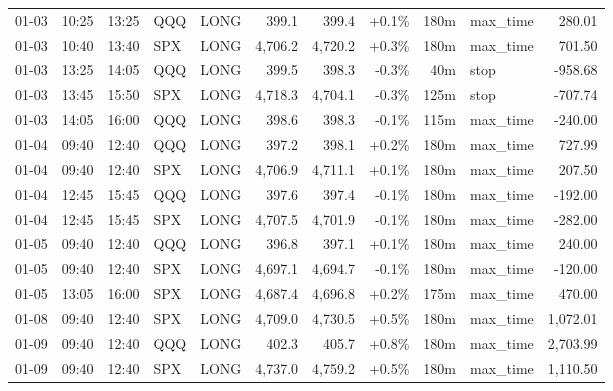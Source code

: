 \documentclass[11pt,a4paper,twoside]{article}
\begin{document}
\begin{center}
\begin{longtable}{>{\color{txtmain}}l l l l l r r r r >{\color{txtmain}}l r}
01-03 & 10:25 & 13:25 & QQQ & LONG & 399.1 & 399.4 & \textcolor{wingreen}{+0.1\%} & 180m & max\_time & \textcolor{wingreen}{280.01} \\
01-03 & 10:40 & 13:40 & SPX & LONG & 4,706.2 & 4,720.2 & \textcolor{wingreen}{+0.3\%} & 180m & max\_time & \textcolor{wingreen}{701.50} \\
01-03 & 13:25 & 14:05 & QQQ & LONG & 399.5 & 398.3 & \textcolor{lossred}{-0.3\%} & 40m & stop & \textcolor{lossred}{-958.68} \\
01-03 & 13:45 & 15:50 & SPX & LONG & 4,718.3 & 4,704.1 & \textcolor{lossred}{-0.3\%} & 125m & stop & \textcolor{lossred}{-707.74} \\
01-03 & 14:05 & 16:00 & QQQ & LONG & 398.6 & 398.3 & \textcolor{lossred}{-0.1\%} & 115m & max\_time & \textcolor{lossred}{-240.00} \\
01-04 & 09:40 & 12:40 & QQQ & LONG & 397.2 & 398.1 & \textcolor{wingreen}{+0.2\%} & 180m & max\_time & \textcolor{wingreen}{727.99} \\
01-04 & 09:40 & 12:40 & SPX & LONG & 4,706.9 & 4,711.1 & \textcolor{wingreen}{+0.1\%} & 180m & max\_time & \textcolor{wingreen}{207.50} \\
01-04 & 12:45 & 15:45 & QQQ & LONG & 397.6 & 397.4 & \textcolor{lossred}{-0.1\%} & 180m & max\_time & \textcolor{lossred}{-192.00} \\
01-04 & 12:45 & 15:45 & SPX & LONG & 4,707.5 & 4,701.9 & \textcolor{lossred}{-0.1\%} & 180m & max\_time & \textcolor{lossred}{-282.00} \\
01-05 & 09:40 & 12:40 & QQQ & LONG & 396.8 & 397.1 & \textcolor{wingreen}{+0.1\%} & 180m & max\_time & \textcolor{wingreen}{240.00} \\
01-05 & 09:40 & 12:40 & SPX & LONG & 4,697.1 & 4,694.7 & \textcolor{lossred}{-0.1\%} & 180m & max\_time & \textcolor{lossred}{-120.00} \\
01-05 & 13:05 & 16:00 & SPX & LONG & 4,687.4 & 4,696.8 & \textcolor{wingreen}{+0.2\%} & 175m & max\_time & \textcolor{wingreen}{470.00} \\
01-08 & 09:40 & 12:40 & SPX & LONG & 4,709.0 & 4,730.5 & \textcolor{wingreen}{+0.5\%} & 180m & max\_time & \textcolor{wingreen}{1,072.01} \\
01-09 & 09:40 & 12:40 & QQQ & LONG & 402.3 & 405.7 & \textcolor{wingreen}{+0.8\%} & 180m & max\_time & \textcolor{wingreen}{2,703.99} \\
01-09 & 09:40 & 12:40 & SPX & LONG & 4,737.0 & 4,759.2 & \textcolor{wingreen}{+0.5\%} & 180m & max\_time & \textcolor{wingreen}{1,110.50} \\

\end{longtable}
\end{center}
\end{document}
